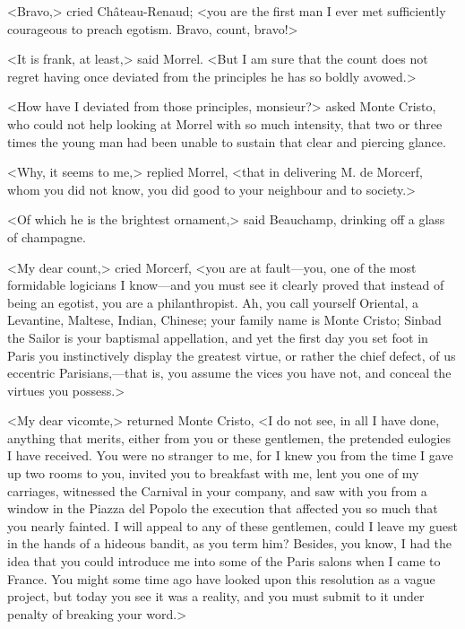  <Bravo,> cried Château-Renaud; <you are the first man I ever met sufficiently courageous to preach egotism. Bravo, count, bravo!> 

 <It is frank, at least,> said Morrel. <But I am sure that the count does not regret having once deviated from the principles he has so boldly avowed.> 

 <How have I deviated from those principles, monsieur?> asked Monte Cristo, who could not help looking at Morrel with so much intensity, that two or three times the young man had been unable to sustain that clear and piercing glance. 

 <Why, it seems to me,> replied Morrel, <that in delivering M. de Morcerf, whom you did not know, you did good to your neighbour and to society.> 

 <Of which he is the brightest ornament,> said Beauchamp, drinking off a glass of champagne. 

 <My dear count,> cried Morcerf, <you are at fault—you, one of the most formidable logicians I know—and you must see it clearly proved that instead of being an egotist, you are a philanthropist. Ah, you call yourself Oriental, a Levantine, Maltese, Indian, Chinese; your family name is Monte Cristo; Sinbad the Sailor is your baptismal appellation, and yet the first day you set foot in Paris you instinctively display the greatest virtue, or rather the chief defect, of us eccentric Parisians,—that is, you assume the vices you have not, and conceal the virtues you possess.> 

 <My dear vicomte,> returned Monte Cristo, <I do not see, in all I have done, anything that merits, either from you or these gentlemen, the pretended eulogies I have received. You were no stranger to me, for I knew you from the time I gave up two rooms to you, invited you to breakfast with me, lent you one of my carriages, witnessed the Carnival in your company, and saw with you from a window in the Piazza del Popolo the execution that affected you so much that you nearly fainted. I will appeal to any of these gentlemen, could I leave my guest in the hands of a hideous bandit, as you term him? Besides, you know, I had the idea that you could introduce me into some of the Paris salons when I came to France. You might some time ago have looked upon this resolution as a vague project, but today you see it was a reality, and you must submit to it under penalty of breaking your word.> 

